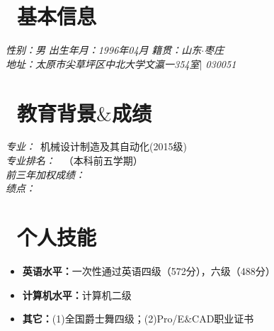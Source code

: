 \documentclass{resume}
\begin{document}


\section{\faHome\ 基本信息}
\textit{\large{性别：男}}\qquad  \qquad \qquad  \qquad \quad 
\textit{\large{出生年月：1996年04月}} \qquad  \qquad \qquad  \qquad \qquad 
\textit{\large{籍贯：山东$ \cdot $枣庄}}\\%
\textit{\large{地址：太原市尖草坪区中北大学文瀛一354室$|$ 030051}}



\section{\faGraduationCap\  教育背景$\&$成绩}
\textit{\large{专业：}}\ 机械设计制造及其自动化(2015级) \\
\textit{\large{专业排名：}} \ （本科前五学期） \\
\textit{\large{前三年加权成绩：}} \\
\textit{\large{绩点：}}

\section{\faCogs\ 个人技能}
\begin{itemize}
  \item \textbf{英语水平：}一次性通过英语四级（572分），六级（488分）
  \item \textbf{计算机水平：}计算机二级
  \item \textbf{其它：}(1)全国爵士舞四级；(2)Pro/E$\&$CAD职业证书
\end{itemize}

\end{document}
